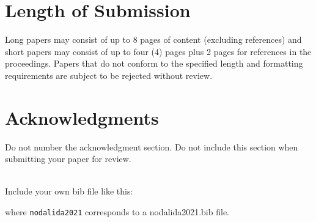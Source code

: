 \documentclass[11pt]{article}
\begin{document}
\section{Length of Submission}
\label{sec:length}

Long papers may consist of up to 8 pages of content (excluding
references) and short papers may consist of up to 
four (4) pages plus 2 pages for references in the proceedings.  Papers that do not conform to the
specified length and formatting requirements are subject to be
rejected without review.

\section*{Acknowledgments}

Do not number the acknowledgment section. Do not include this section
when submitting your paper for review.

 \\
Include your own bib file like this:
\verb||
\verb|| 

where \verb|nodalida2021| corresponds to a nodalida2021.bib file.





\end{document}
